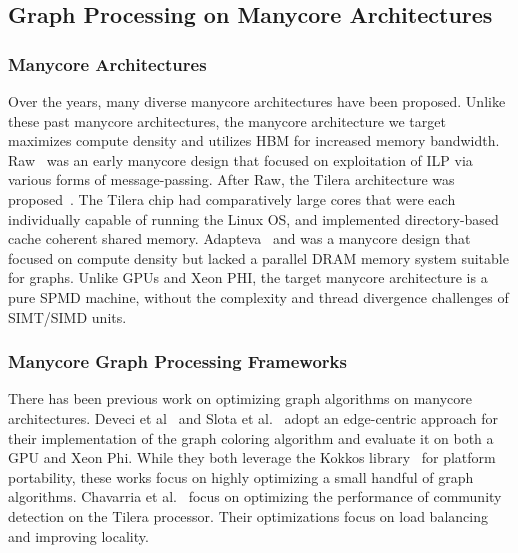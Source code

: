 \subsection{Graph Processing on Manycore Architectures}
\subsubsection{Manycore Architectures} Over the years, many diverse manycore architectures have been proposed. Unlike these past manycore architectures, the manycore architecture we target maximizes compute density and utilizes HBM for increased memory bandwidth. Raw~\cite{taylor2004raw} was an early manycore design that focused on exploitation of ILP via various forms of message-passing. 
After Raw, the Tilera architecture was proposed~\cite{ramey2011tilera}.
The Tilera chip had comparatively large cores that were each individually capable of running the Linux OS, and implemented directory-based cache coherent shared memory. 
Adapteva~\cite{gwennap2011adapteva} and \cite{agathos2015parallela} was a manycore design that focused on compute density but lacked a parallel DRAM memory system suitable for graphs. Unlike GPUs and Xeon PHI, the target manycore architecture is a pure SPMD machine, without the complexity and thread divergence challenges of SIMT/SIMD units.

\subsubsection{Manycore Graph Processing Frameworks} There has been previous work on optimizing graph algorithms on manycore architectures.
Deveci et al~\cite{deveci2016kokkos} and Slota et al.~\cite{slota2015high} adopt an edge-centric approach for their implementation of the graph coloring algorithm and evaluate it on both a GPU and Xeon Phi. 
While they both leverage the Kokkos library~\cite{deveci2016kokkos} for platform portability, these works focus on highly optimizing a small handful of graph algorithms.
Chavarria et al.~\cite{chavarria2014scaling} focus on optimizing the performance of community detection on the Tilera processor.
Their optimizations focus on load balancing and improving locality.


